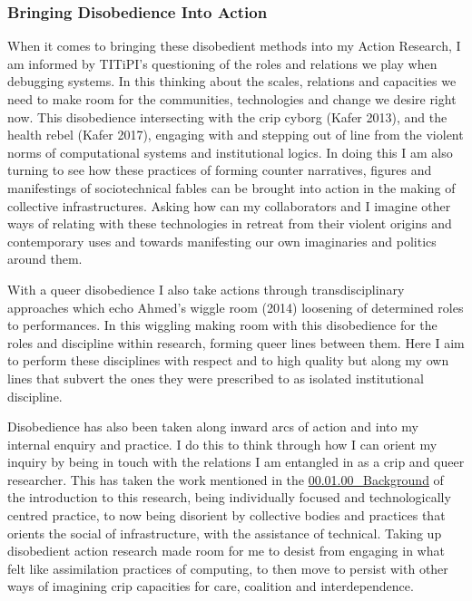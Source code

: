 \hypertarget{bringing-disobedience-into-action-1}{%
\subsubsection[Bringing Disobedience Into
Action]{\texorpdfstring{\protect\hypertarget{anchor}{}{}Bringing
Disobedience Into
Action}{Bringing Disobedience Into Action}}\label{bringing-disobedience-into-action-1}}

When it comes to bringing these disobedient methods into my Action
Research, I am informed by TITiPI's questioning of the roles and
relations we play when debugging systems. In this thinking about the
scales, relations and capacities we need to make room for the
communities, technologies and change we desire right now. This
disobedience intersecting with the crip cyborg (Kafer 2013), and the
health rebel (Kafer 2017), engaging with and stepping out of line from
the violent norms of computational systems and institutional logics. In
doing this I am also turning to see how these practices of forming
counter narratives, figures and manifestings of sociotechnical fables
can be brought into action in the making of collective infrastructures.
Asking how can my collaborators and I imagine other ways of relating
with these technologies in retreat from their violent origins and
contemporary uses and towards manifesting our own imaginaries and
politics around them.

With a queer disobedience I also take actions through transdisciplinary
approaches which echo Ahmed's wiggle room (2014) loosening of determined
roles to performances. In this wiggling making room with this
disobedience for the roles and discipline within research, forming queer
lines between them. Here I aim to perform these disciplines with respect
and to high quality but along my own lines that subvert the ones they
were prescribed to as isolated institutional discipline.

Disobedience has also been taken along inward arcs of action and into my
internal enquiry and practice. I do this to think through how I can
orient my inquiry by being in touch with the relations I am entangled in
as a crip and queer researcher. This has taken the work mentioned in the
\href{../../00_Introduction/sections/00.01.00_Background.md}{00.01.00\_Background}
of the introduction to this research, being individually focused and
technologically centred practice, to now being disorient by collective
bodies and practices that orients the social of infrastructure, with the
assistance of technical. Taking up disobedient action research made room
for me to desist from engaging in what felt like assimilation practices
of computing, to then move to persist with other ways of imagining crip
capacities for care, coalition and interdependence.

